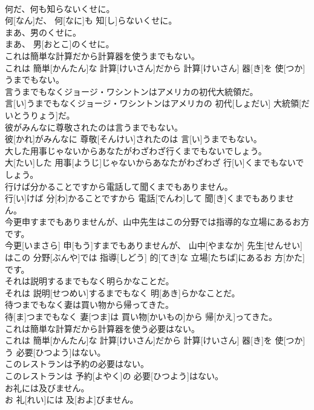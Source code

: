 \documentclass[8pt]{extreport}
\begin{document}
\begin{CJK}{UTF8}{min}
\\	何だ、何も知らないくせに。	
\\	何[なん]だ、 何[なに]も 知[し]らないくせに。
\\	まあ、男のくせに。	
\\	まあ、 男[おとこ]のくせに。
\\	これは簡単な計算だから計算器を使うまでもない。	
\\	これは 簡単[かんたん]な 計算[けいさん]だから 計算[けいさん] 器[き]を 使[つか]うまでもない。
\\	言うまでもなくジョージ・ワシントンはアメリカの初代大統領だ。	
\\	言[い]うまでもなくジョージ・ワシントンはアメリカの 初代[しょだい] 大統領[だいとうりょう]だ。
\\	彼がみんなに尊敬されたのは言うまでもない。	
\\	彼[かれ]がみんなに 尊敬[そんけい]されたのは 言[い]うまでもない。
\\	大した用事じゃないからあなたがわざわざ行くまでもないでしょう。	
\\	大[たい]した 用事[ようじ]じゃないからあなたがわざわざ 行[い]くまでもないでしょう。
\\	行けば分かることですから電話して聞くまでもありません。	
\\	行[い]けば 分[わ]かることですから 電話[でんわ]して 聞[き]くまでもありません。
\\	今更申すまでもありませんが、山中先生はこの分野では指導的な立場にあるお方です。	
\\	今更[いまさら] 申[もう]すまでもありませんが、 山中[やまなか] 先生[せんせい]はこの 分野[ぶんや]では 指導[しどう] 的[てき]な 立場[たちば]にあるお 方[かた]です。
\\	それは説明するまでもなく明らかなことだ。	
\\	それは 説明[せつめい]するまでもなく 明[あき]らかなことだ。
\\	待つまでもなく妻は買い物から帰ってきた。	
\\	待[ま]つまでもなく 妻[つま]は 買い物[かいもの]から 帰[かえ]ってきた。
\\	これは簡単な計算だから計算器を使う必要はない。	
\\	これは 簡単[かんたん]な 計算[けいさん]だから 計算[けいさん] 器[き]を 使[つか]う 必要[ひつよう]はない。
\\	このレストランは予約の必要はない。	
\\	このレストランは 予約[よやく]の 必要[ひつよう]はない。
\\	お礼には及びません。	
\\	お 礼[れい]には 及[およ]びません。

\end{CJK}
\end{document}

